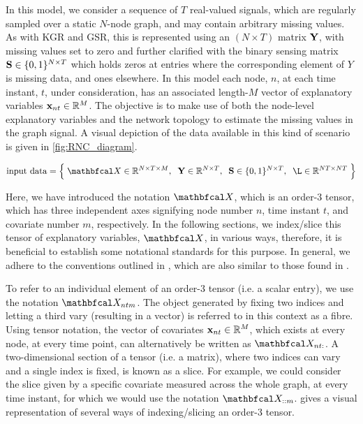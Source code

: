 In this model, we consider a sequence of $T$ real-valued signals, which are regularly sampled over a static $N$-node graph, and may contain arbitrary missing values. As with KGR and GSR, this is represented using an $(N \times T)$ matrix $\mathbf{Y}$, with missing values set to zero and further clarified with the binary sensing matrix $\mathbf{S} \in \{0, 1\}^{N \times T}$ which holds zeros at entries where the corresponding element of $Y$ is missing data, and ones elsewhere. In this model each node, $n$, at each time instant, $t$, under consideration, has an associated length-$M$ vector of explanatory variables $\mathbf{x}_{nt} \in \mathbb{R}^{M}$. The objective is to make use of both the node-level explanatory variables and the network topology to estimate the missing values in the graph signal. A visual depiction of the data available in this kind of scenario is given in \cref{fig:RNC_diagram}. 

\begin{equation*}
    \text{input data} = \Big\{ \;\Xt \in \R^{N \times T \times M}, \;\; \Y \in \R^{N \times T}, \;\; \Ss \in \{0, 1\}^{N \times T}, \;\; \L \in \R^{NT \times NT} \; \Big\}
\end{equation*}

Here, we have introduced the notation $\Xt$, which is an order-3 tensor, which has three independent axes signifying node number $n$, time instant $t$, and covariate number $m$, respectively. In the following sections, we index/slice this tensor of explanatory variables, $\Xt$, in various ways, therefore, it is beneficial to establish some notational standards for this purpose. In general, we adhere to the conventions outlined in \cite{Kolda2009}, which are also similar to those found in \cite{Kiers2000}. 

To refer to an individual element of an order-3 tensor (i.e. a scalar entry), we use the notation $\Xt_{ntm}$. The object generated by fixing two indices and letting a third vary (resulting in a vector) is referred to in this context as a fibre. Using tensor notation, the vector of covariates $\mathbf{x}_{nt} \in \mathbb{R}^{M}$, which exists at every node, at every time point, can alternatively be written as $\Xt_{nt:}$. A two-dimensional section of a tensor (i.e. a matrix), where two indices can vary and a single index is fixed, is known as a slice. For example, we could consider the slice given by a specific covariate measured across the whole graph, at every time instant, for which we would use the notation $\Xt_{::m}$.  gives a visual representation of several ways of indexing/slicing an order-3 tensor. 


